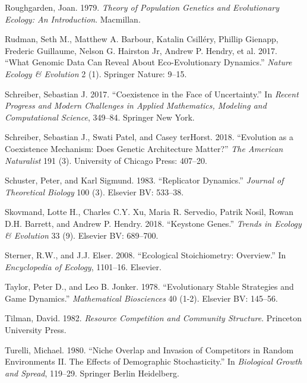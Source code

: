 \documentclass[]{article}
\begin{document}
\leavevmode\hypertarget{ref-joanroughgarden1979}{}%
Roughgarden, Joan. 1979. \emph{Theory of Population Genetics and
Evolutionary Ecology: An Introduction}. Macmillan.

\leavevmode\hypertarget{ref-Rudman2017}{}%
Rudman, Seth M., Matthew A. Barbour, Katalin Csilléry, Phillip Gienapp,
Frederic Guillaume, Nelson G. Hairston Jr, Andrew P. Hendry, et al.
2017. ``What Genomic Data Can Reveal About Eco-Evolutionary Dynamics.''
\emph{Nature Ecology \& Evolution} 2 (1). Springer Nature: 9--15.

\leavevmode\hypertarget{ref-Schreiber2017}{}%
Schreiber, Sebastian J. 2017. ``Coexistence in the Face of
Uncertainty.'' In \emph{Recent Progress and Modern Challenges in Applied
Mathematics, Modeling and Computational Science}, 349--84. Springer New
York.

\leavevmode\hypertarget{ref-Schreiber2018}{}%
Schreiber, Sebastian J., Swati Patel, and Casey terHorst. 2018.
``Evolution as a Coexistence Mechanism: Does Genetic Architecture
Matter?'' \emph{The American Naturalist} 191 (3). University of Chicago
Press: 407--20.

\leavevmode\hypertarget{ref-Schuster1983}{}%
Schuster, Peter, and Karl Sigmund. 1983. ``Replicator Dynamics.''
\emph{Journal of Theoretical Biology} 100 (3). Elsevier BV: 533--38.

\leavevmode\hypertarget{ref-Skovmand2018}{}%
Skovmand, Lotte H., Charles C.Y. Xu, Maria R. Servedio, Patrik Nosil,
Rowan D.H. Barrett, and Andrew P. Hendry. 2018. ``Keystone Genes.''
\emph{Trends in Ecology \& Evolution} 33 (9). Elsevier BV: 689--700.

\leavevmode\hypertarget{ref-Sterner2008}{}%
Sterner, R.W., and J.J. Elser. 2008. ``Ecological Stoichiometry:
Overview.'' In \emph{Encyclopedia of Ecology}, 1101--16. Elsevier.

\leavevmode\hypertarget{ref-Taylor1978}{}%
Taylor, Peter D., and Leo B. Jonker. 1978. ``Evolutionary Stable
Strategies and Game Dynamics.'' \emph{Mathematical Biosciences} 40
(1-2). Elsevier BV: 145--56.

\leavevmode\hypertarget{ref-davidtilman1982}{}%
Tilman, David. 1982. \emph{Resource Competition and Community
Structure}. Princeton University Press.

\leavevmode\hypertarget{ref-Turelli1980}{}%
Turelli, Michael. 1980. ``Niche Overlap and Invasion of Competitors in
Random Environments II. The Effects of Demographic Stochasticity.'' In
\emph{Biological Growth and Spread}, 119--29. Springer Berlin
Heidelberg.
\end{document}
